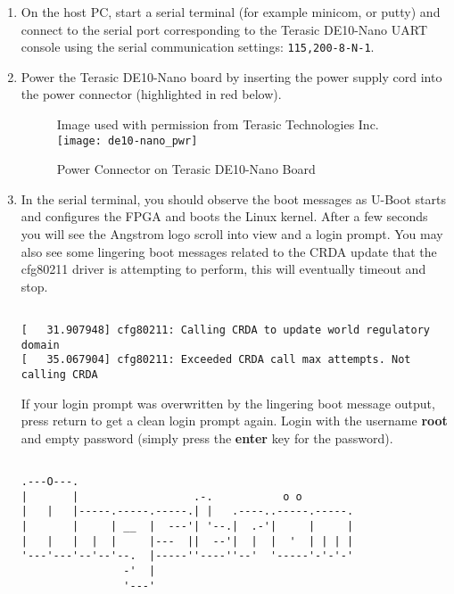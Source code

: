 \begin{flushleft}
\begin{enumerate}[
	label=\textbf{Step \arabic*.},
	leftmargin=*,
	widest={00},
	align=left]
\item On the host PC, start a serial terminal (for example minicom, or putty) and connect to the serial port corresponding to the Terasic DE10-Nano UART console using the serial communication settings: \texttt{115,200-8-N-1}.

\item Power the Terasic DE10-Nano board by inserting the power supply cord into the power connector (highlighted in red below).

\begin{figure}[H]
\centering
\scriptsize{Image used with permission from Terasic Technologies Inc.}
\newline
\texttt{[image: de10-nano\_pwr]}
\caption{Power Connector on Terasic DE10-Nano Board}
\label{fig:de10-nano_pwr}
\end{figure}

\item In the serial terminal, you should observe the boot messages as U-Boot starts and configures the FPGA and boots the Linux kernel.  After a few seconds you will see the Angstrom logo scroll into view and a login prompt.  You may also see some lingering boot messages related to the CRDA update that the cfg80211 driver is attempting to perform, this will eventually timeout and stop.

\begin{verbatim}

[   31.907948] cfg80211: Calling CRDA to update world regulatory domain
[   35.067904] cfg80211: Exceeded CRDA call max attempts. Not calling CRDA

\end{verbatim}

If your login prompt was overwritten by the lingering boot message output, press return to get a clean login prompt again.  Login with the username \textbf{root} and empty password (simply press the \textbf{enter} key for the password).

\begin{verbatim}

.---O---.
|       |                  .-.           o o
|   |   |-----.-----.-----.| |   .----..-----.-----.
|       |     | __  |  ---'| '--.|  .-'|     |     |
|   |   |  |  |     |---  ||  --'|  |  |  '  | | | |
'---'---'--'--'--.  |-----''----''--'  '-----'-'-'-'
                -'  |
                '---'


\end{verbatim}
\end{enumerate}
\end{flushleft}

